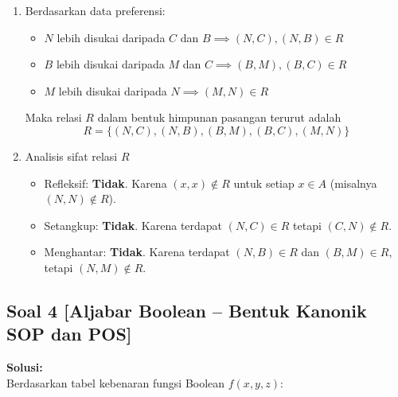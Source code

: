 \documentclass[12pt,a4paper]{article}
\begin{document}
\begin{enumerate}[label=(\alph*)]
    \item Berdasarkan data preferensi:
    \begin{itemize}
        \item $N$ lebih disukai daripada $C$ dan $B \implies (N, C), (N, B) \in R$
        \item $B$ lebih disukai daripada $M$ dan $C \implies (B, M), (B, C) \in R$
        \item $M$ lebih disukai daripada $N \implies (M, N) \in R$
    \end{itemize}
    Maka relasi $R$ dalam bentuk himpunan pasangan terurut adalah
    \[ \boxed{R = \{(N, C), (N, B), (B, M), (B, C), (M, N)\}} \]

    \item Analisis sifat relasi $R$
    \begin{itemize}
        \item Refleksif: \textbf{Tidak}. Karena $(x, x) \notin R$ untuk setiap $x \in A$ (misalnya $(N, N) \notin R$).
        \item Setangkup: \textbf{Tidak}. Karena terdapat $(N, C) \in R$ tetapi $(C, N) \notin R$.
        \item Menghantar: \textbf{Tidak}. Karena terdapat $(N, B) \in R$ dan $(B, M) \in R$, tetapi $(N, M) \notin R$.
    \end{itemize}
\end{enumerate}

\subsection*{Soal 4 [Aljabar Boolean -- Bentuk Kanonik SOP dan POS]}
\textbf{Solusi:} \\
Berdasarkan tabel kebenaran fungsi Boolean $f(x, y, z)$:
\end{document}
